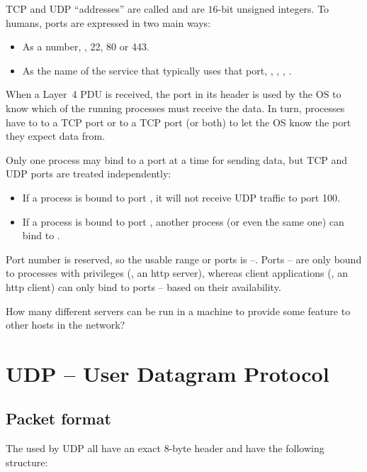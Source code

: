 TCP and UDP ``addresses'' are called  and are $16$-bit unsigned integers.
To humans, ports are expressed in two main ways:
\begin{itemize}
\item As a number, \eg, 22, 80 or 443.
\item As the name of the service that typically uses that port, \eg, , , .
\end{itemize}

When a Layer~4 PDU is received, the port in its header is used by the OS to know which of the running 
processes must receive the data. 
In turn, processes have to  to a TCP port or to a TCP port (or both)
to let the OS know the port they expect data from.

Only one process may bind to a port at a time for sending data, but TCP and UDP ports
are treated independently:
\begin{itemize}
 \item If a process is bound to port , it will not receive UDP traffic to port 100.
 \item If a process is bound to port , another process (or even the same one) can 
   bind to .  
\end{itemize}

Port number  is reserved, so the usable range or ports is \mbox{--}.
Ports -- are only bound to 
processes with privileges (\eg, an http server), whereas client applications (\eg, an http client) 
can only bind to ports -- based on their availability.

\begin{exercise}
How many different servers can be run in a machine to provide some feature to other hosts in the network?
\end{exercise}


\section{UDP -- User Datagram Protocol}\label{sec:layer4:udp}
\subsection{Packet format}\label{sec:layer4:udp:packet_format}

The  used by UDP all have an exact $8$-byte header and
have the following structure:

